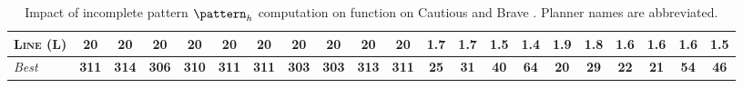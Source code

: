 \documentclass[11pt,landscape]{article}
\begin{document}
\begin{table}[tb]
{\begin{tabular}{|l||cccccccccc||cccccccccc||}
\textsc{Line} (L)&\textbf{20}&\textbf{20}&\textbf{20}&\textbf{20}&\textbf{20}&\textbf{20}&\textbf{20}&\textbf{20}&\textbf{20}&\textbf{20}&1.7&1.7&1.5&\textbf{1.4}&1.9&1.8&1.6&1.6&1.6&1.5
\\\hline
\textit{Best}&\textbf{311}&\textbf{314}&\textbf{306}&\textbf{310}&\textbf{311}&\textbf{311}&\textbf{303}&\textbf{303}&\textbf{313}&\textbf{311}&\textbf{25}&\textbf{31}&\textbf{40}&\textbf{64}&\textbf{20}&\textbf{29}&\textbf{22}&\textbf{21}&\textbf{54}&\textbf{46}\\\hline

        \end{tabular}}
        \caption{Impact of incomplete pattern $\pattern_h$ computation on function on Cautious and Brave \pattyd. Planner names are abbreviated.}
        \label{tab:abl-patternh-incomplete}
        \end{table}
        
\end{document}
